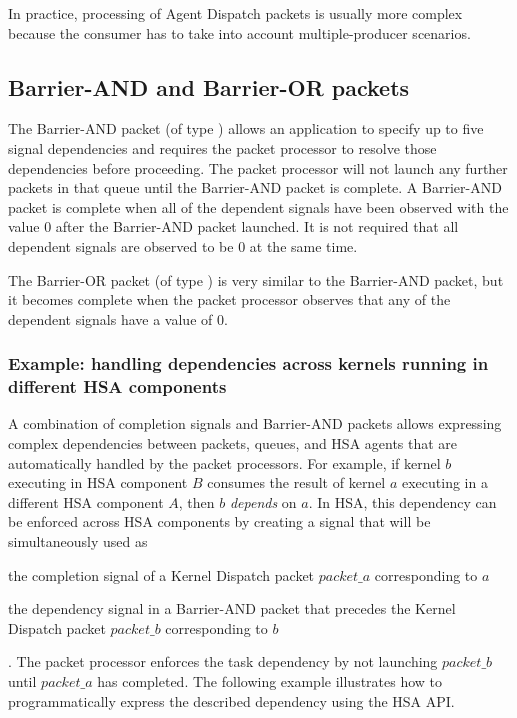 \documentclass[final,oneside]{book}
\begin{document}


In practice, processing of Agent Dispatch packets is usually more
complex because the consumer has to take into account multiple-producer
scenarios.

\subsection{Barrier-AND and Barrier-OR packets}\label{barrier-packet}

The Barrier-AND packet (of type ) allows an
application to specify up to five signal dependencies and requires the packet
processor to resolve those dependencies before proceeding. The packet processor
will not launch any further packets in that queue until the Barrier-AND packet
is complete. A Barrier-AND packet is complete when all of the dependent signals
have been observed with the value 0 after the Barrier-AND packet launched. It is
not required that all dependent signals are observed to be 0 at the same time.

The Barrier-OR packet (of type ) is very similar
to the Barrier-AND packet, but it becomes complete when the packet processor
observes that any of the dependent signals have a value of 0.

\subsubsection{Example: handling dependencies across kernels running in
  different HSA components}
A combination of completion signals and Barrier-AND packets allows expressing
complex dependencies between packets, queues, and HSA agents that are
automatically handled by the packet processors. For example, if kernel $b$
executing in HSA component $B$ consumes the result of kernel $a$ executing in a
different HSA component $A$, then $b$ \textit{depends} on $a$. In HSA, this
dependency can be enforced across HSA components by creating a signal that will
be simultaneously used as \begin{inparaenum}[1\upshape)] \item the completion
  signal of a Kernel Dispatch packet $packet\_a$ corresponding to $a$ \item the
  dependency signal in a Barrier-AND packet that precedes the Kernel Dispatch packet
  $packet\_b$ corresponding to $b$\end{inparaenum}. The packet processor
enforces the task dependency by not launching $packet\_b$ until $packet\_a$ has
completed. The following example illustrates how to programmatically express the
described dependency using the HSA API.

\end{document}
